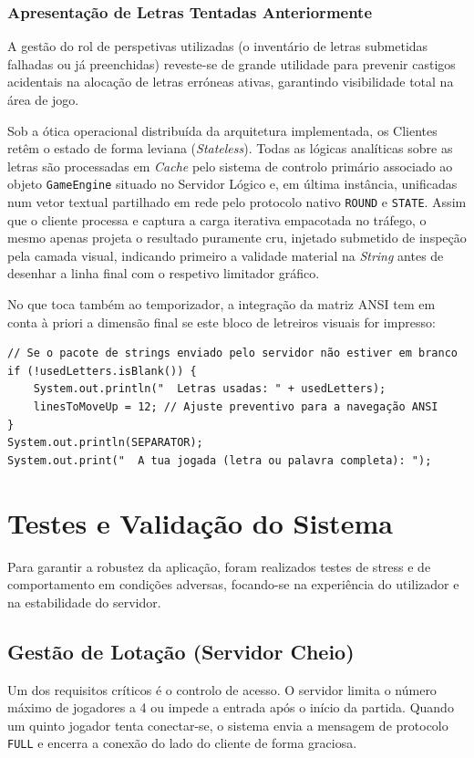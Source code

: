 \documentclass[11pt,a4paper,oneside]{report}
\begin{document}
\subsection{Apresentação de Letras Tentadas Anteriormente}
A gestão do rol de perspetivas utilizadas (o inventário de letras submetidas falhadas ou já preenchidas) reveste-se de grande utilidade para prevenir castigos acidentais na alocação de letras erróneas ativas, garantindo visibilidade total na área de jogo.

Sob a ótica operacional distribuída da arquitetura implementada, os Clientes retêm o estado de forma leviana (\textit{Stateless}). Todas as lógicas analíticas sobre as letras são processadas em \textit{Cache} pelo sistema de controlo primário associado ao objeto \texttt{GameEngine} situado no Servidor Lógico e, em última instância, unificadas num vetor textual partilhado em rede pelo protocolo nativo \texttt{ROUND} e \texttt{STATE}. 
Assim que o cliente processa e captura a carga iterativa empacotada no tráfego, o mesmo apenas projeta o resultado puramente cru, injetado submetido de inspeção pela camada visual, indicando primeiro a validade material na \textit{String} antes de desenhar a linha final com o respetivo limitador gráfico.

No que toca também ao temporizador, a integração da matriz ANSI tem em conta à priori a dimensão final se este bloco de letreiros visuais for impresso:
\begin{lstlisting}[caption={Sincronização passiva do Cliente com as Letras Usadas}]
// Se o pacote de strings enviado pelo servidor não estiver em branco
if (!usedLetters.isBlank()) {
    System.out.println("  Letras usadas: " + usedLetters);
    linesToMoveUp = 12; // Ajuste preventivo para a navegação ANSI
}
System.out.println(SEPARATOR);
System.out.print("  A tua jogada (letra ou palavra completa): ");
\end{lstlisting}


\chapter{Testes e Validação do Sistema}
Para garantir a robustez da aplicação, foram realizados testes de stress e de comportamento em condições adversas, focando-se na experiência do utilizador e na estabilidade do servidor.

\section{Gestão de Lotação (Servidor Cheio)}
Um dos requisitos críticos é o controlo de acesso. O servidor limita o número máximo de jogadores a 4 ou impede a entrada após o início da partida. Quando um quinto jogador tenta conectar-se, o sistema envia a mensagem de protocolo \texttt{FULL} e encerra a conexão do lado do cliente de forma graciosa. 
\end{document}
